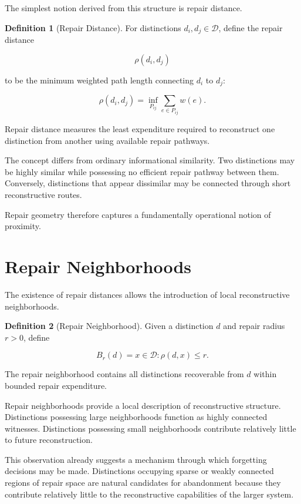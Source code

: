 \documentclass[12pt,oneside]{book}
\theoremstyle{plain} \newtheorem{theorem}{Theorem}[chapter] \newtheorem{lemma}[theorem]{Lemma} \newtheorem{proposition}[theorem]{Proposition} \newtheorem{corollary}[theorem]{Corollary}
\theoremstyle{definition} \newtheorem{definition}[theorem]{Definition} \newtheorem{axiom}[theorem]{Axiom} \newtheorem{construction}[theorem]{Construction}
\theoremstyle{remark} \newtheorem{remark}[theorem]{Remark} \newtheorem{example}[theorem]{Example}
\newcommand{\D}{\mathcal{D}} \newcommand{\R}{\mathcal{R}} \newcommand{\F}{\mathcal{F}} \newcommand{\U}{\mathcal{U}} \newcommand{\M}{\mathcal{M}} \newcommand{\G}{\Gamma}
\begin{document}
The simplest notion derived from this structure is repair distance.

\begin{definition}[Repair Distance]

For distinctions $d_i,d_j\in\D$, define the repair distance

\[
\rho(d_i,d_j)
\]

to be the minimum weighted path length connecting $d_i$ to $d_j$:

\[
\rho(d_i,d_j)
=
\inf_{P_{ij}}
\sum_{e\in P_{ij}}
w(e).
\]

\end{definition}

Repair distance measures the least expenditure required to reconstruct one distinction from another using available repair pathways.

The concept differs from ordinary informational similarity. Two distinctions may be highly similar while possessing no efficient repair pathway between them. Conversely, distinctions that appear dissimilar may be connected through short reconstructive routes.

Repair geometry therefore captures a fundamentally operational notion of proximity.

\section{Repair Neighborhoods}

The existence of repair distances allows the introduction of local reconstructive neighborhoods.

\begin{definition}[Repair Neighborhood]

Given a distinction $d$ and repair radius $r>0$, define

\[
B_r(d)
=
{
x\in\D
:
\rho(d,x)\leq r
}.
\]

\end{definition}

The repair neighborhood contains all distinctions recoverable from $d$ within bounded repair expenditure.

Repair neighborhoods provide a local description of reconstructive structure. Distinctions possessing large neighborhoods function as highly connected witnesses. Distinctions possessing small neighborhoods contribute relatively little to future reconstruction.

This observation already suggests a mechanism through which forgetting decisions may be made. Distinctions occupying sparse or weakly connected regions of repair space are natural candidates for abandonment because they contribute relatively little to the reconstructive capabilities of the larger system.
\end{document}
